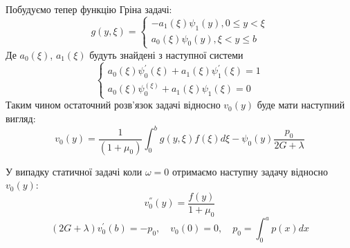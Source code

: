 Побудуємо тепер функцію Гріна задачі:
\begin{equation*}
    g(y, \xi) = \begin{cases}
        -a_1(\xi) \psi_1(y), 0 \le y < \xi \\
        a_0(\xi) \psi_0(y), \xi < y \le b
    \end{cases}
\end{equation*}
Де $a_0(\xi)$, $a_1(\xi)$ будуть знайдені з наступної системи
\begin{equation*}
    \begin{cases}
        a_0(\xi) \psi_0^{'}(\xi) + a_1(\xi) \psi_1^{'}(\xi) = 1 \\
        a_0(\xi) \psi_0^(\xi) + a_1(\xi) \psi_1(\xi) = 0
    \end{cases}
\end{equation*}
Таким чином остаточний розв'язок задачі відносно $v_0(y)$ буде мати наступний вигляд:
\begin{equation*}
    v_0(y) = \frac{1}{(1+\mu_0)} \int_{0}^{b}g(y,\xi) f(\xi) d\xi - \psi_0(y) \frac{p_0}{2G + \lambda}
\end{equation*}

У випадку статичної задачі коли $\omega = 0$ отримаємо наступну задачу відносно $v_0(y)$:
\begin{equation*}
    v_0^{''}(y) = \frac{f(y)}{1+\mu_0}
\end{equation*}
\begin{equation*}
    (2G + \lambda)v_0^{'}(b) = -p_0, \quad v_0(0) = 0, \quad p_0 = \int_{0}^{a}p(x)dx
\end{equation*}